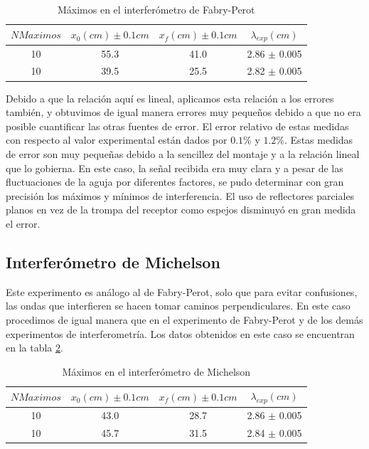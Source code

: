\documentclass[%
 reprint,
 amsmath,amssymb,
 aps,
]{revtex4-1}
\begin{document}
\begin{table}[h!]
\centering
 \begin{tabular}{|c|c|c|c|} 
 \hline
 $N Maximos$& $x_0(cm) \pm 0.1cm$ & $x_f(cm) \pm 0.1cm$ & $\lambda_{exp} (cm)$ \\ [0.5ex] 
 \hline\hline
 10 & 55.3 & 41.0 & 2.86 $\pm$ 0.005\\
 10 & 39.5 & 25.5 & 2.82 $\pm$ 0.005\\
[1ex] 
 \hline
 \end{tabular}
 \caption{Máximos en el interferómetro de Fabry-Perot}
 \label{table:Fabry}
\end{table}

Debido a que la relación aquí es lineal, aplicamos esta relación a los errores también, y obtuvimos de igual manera errores muy pequeños debido a que no era posible cuantificar las otras fuentes de error. El error relativo de estas medidas con respecto al valor experimental están dados por $0.1\%$ y $1.2\%$. Estas medidas de error son muy pequeñas debido a la sencillez del montaje y a la relación lineal que lo gobierna. En este caso, la señal recibida era muy clara y a pesar de las fluctuaciones de la aguja por diferentes factores, se pudo determinar con gran precisión los máximos y mínimos de interferencia. El uso de reflectores parciales planos en vez de la trompa del receptor como espejos disminuyó en gran medida el error. \\

\subsection{\label{sec:level2}Interferómetro de Michelson}
Este experimento es análogo al de Fabry-Perot, solo que para evitar confusiones, las ondas que interfieren se hacen tomar caminos perpendiculares. En este caso procedimos de igual manera que en el experimento de Fabry-Perot y de los demás experimentos de interferometría. Los datos obtenidos en este caso se encuentran en la tabla \ref{table:Michelson}.\\

\begin{table}[h!]
\centering
 \begin{tabular}{|c|c|c|c|} 
 \hline
 $N Maximos$& $x_0(cm) \pm 0.1cm$ & $x_f(cm) \pm 0.1cm$ & $\lambda_{exp} (cm)$ \\ [0.5ex] 
 \hline\hline
 10 & 43.0 & 28.7 & 2.86 $\pm$ 0.005\\
 10 & 45.7 & 31.5 & 2.84 $\pm$ 0.005\\
[1ex] 
 \hline
 \end{tabular}
 \caption{Máximos en el interferómetro de Michelson}
 \label{table:Michelson}
\end{table} 
\end{document}

